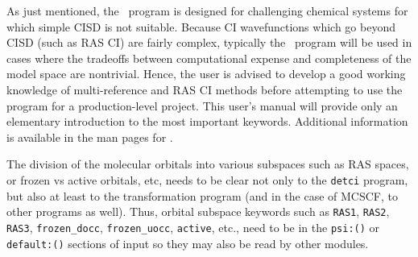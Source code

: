 As just mentioned, the \PSIthree\ program is designed for challenging 
chemical systems for which simple CISD is not suitable.  Because
CI wavefunctions which go beyond CISD (such as RAS CI) are fairly complex,
typically the \PSIdetci\ program will be used in cases where the 
tradeoffs between computational expense and completeness of the 
model space are nontrivial.  Hence, the user is advised to develop
a good working knowledge of multi-reference and RAS CI methods before
attempting to use the program for a production-level project.  This user's
manual will provide only an elementary introduction to the most
important keywords.  Additional information is available in the 
man pages for \PSIdetci.

The division of the molecular orbitals into various subspaces such as
RAS spaces, or frozen vs active orbitals, etc, needs to be clear not
only to the {\tt detci} program, but also at least to the transformation
program (and in the case of MCSCF, to other programs as well).  Thus,
orbital subspace keywords such as {\tt RAS1}, {\tt RAS2}, {\tt RAS3},
{\tt frozen\_docc}, {\tt frozen\_uocc}, {\tt active}, etc., need to be
in the {\tt psi:()} or {\tt default:()} sections of input so they may
also be read by other modules.

